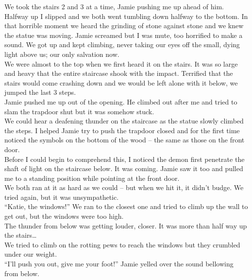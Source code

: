 \documentclass[a5paper]{scrartcl}
\begin{document}
We took the stairs 2 and 3 at a time, Jamie pushing me up ahead of him. Halfway up I slipped and we both went tumbling down halfway to the bottom. In that horrible moment we heard the grinding of stone against stone and we knew the statue was moving. Jamie screamed but I was mute, too horrified to make a sound. We got up and kept climbing, never taking our eyes off the small, dying light above us; our only salvation now.\\


We were almost to the top when we first heard it on the stairs. It was so large and heavy that the entire staircase shook with the impact. Terrified that the stairs would come crashing down and we would be left alone with it below, we jumped the last 3 steps.\\


Jamie pushed me up out of the opening. He climbed out after me and tried to slam the trapdoor shut but it was somehow stuck.\\


We could hear a deafening thunder on the staircase as the statue slowly climbed the steps. I helped Jamie try to push the trapdoor closed and for the first time noticed the symbols on the bottom of the wood – the same as those on the front door.\\


Before I could begin to comprehend this, I noticed the demon first penetrate the shaft of light on the staircase below. It was coming. Jamie saw it too and pulled me to a standing position while pointing at the front door.\\


We both ran at it as hard as we could – but when we hit it, it didn't budge. We tried again, but it was unsympathetic.\\


\enquote{Katie, the windows!} We ran to the closest one and tried to climb up the wall to get out, but the windows were too high.\\


The thunder from below was getting louder, closer. It was more than half way up the stairs\dots\\


We tried to climb on the rotting pews to reach the windows but they crumbled under our weight.\\


\enquote{I'll push you out, give me your foot!} Jamie yelled over the sound bellowing from below.\\
\end{document}
